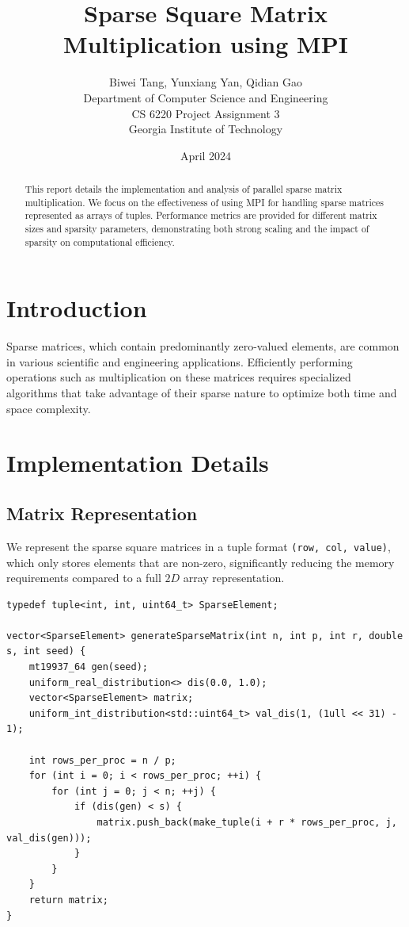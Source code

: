 \documentclass{article}
\title{Sparse Square Matrix Multiplication using MPI}
\author{
  Biwei Tang, Yunxiang Yan, Qidian Gao \\
  Department of Computer Science and Engineering \\
  CS 6220 Project Assignment 3\\
  Georgia Institute of Technology
}
\date{April 2024}
\begin{document}
\maketitle

\begin{abstract}
    This report details the implementation and analysis of parallel sparse matrix multiplication. We focus on the effectiveness of using MPI for handling sparse matrices represented as arrays of tuples. Performance metrics are provided for different matrix sizes and sparsity parameters, demonstrating both strong scaling and the impact of sparsity on computational efficiency.
\end{abstract}

\section{Introduction}
Sparse matrices, which contain predominantly zero-valued elements, are common in various scientific and engineering applications. Efficiently performing operations such as multiplication on these matrices requires specialized algorithms that take advantage of their sparse nature to optimize both time and space complexity.

\section{Implementation Details}

\subsection{Matrix Representation}
We represent the sparse square matrices in a tuple format \texttt{(row, col, value)}, which only stores elements that are non-zero, significantly reducing the memory requirements compared to a full \(2D\) array representation.

\begin{verbatim}
typedef tuple<int, int, uint64_t> SparseElement;

vector<SparseElement> generateSparseMatrix(int n, int p, int r, double s, int seed) {
    mt19937_64 gen(seed);
    uniform_real_distribution<> dis(0.0, 1.0);
    vector<SparseElement> matrix;
    uniform_int_distribution<std::uint64_t> val_dis(1, (1ull << 31) - 1);

    int rows_per_proc = n / p;
    for (int i = 0; i < rows_per_proc; ++i) {
        for (int j = 0; j < n; ++j) {
            if (dis(gen) < s) {
                matrix.push_back(make_tuple(i + r * rows_per_proc, j, val_dis(gen)));
            }
        }
    }
    return matrix;
}
\end{verbatim}
\end{document}
